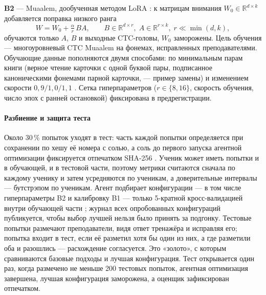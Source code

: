 \textbf{B2} --- Muaalem, дообученная методом LoRA \cite{SRC-111}: к матрицам внимания $W_0\in\mathbb{R}^{d\times k}$
добавляется поправка низкого ранга
\begin{equation}
  W = W_0 + \tfrac{\alpha}{r}\,BA, \qquad B\in\mathbb{R}^{d\times r},\; A\in\mathbb{R}^{r\times k},\; r\ll\min(d,k),
\end{equation}
обучаются только $A$, $B$ и выходные CTC-головы, $W_0$ заморожены. Цель обучения --- многоуровневый CTC
Muaalem на фонемах, исправленных преподавателями. Обучающие данные пополняются двумя способами: по
минимальным парам книги (верное чтение карточки с одной буквой пары, подписанное каноническими фонемами
парной карточки, --- пример замены) \cite{SRC-119} и изменением скорости $0{,}9/1{,}0/1{,}1$
\cite{SRC-120}. Сетка гиперпараметров ($r\in\{8,16\}$, скорость обучения, число эпох с ранней остановкой)
фиксирована в предрегистрации.

\paragraph{Разбиение и защита теста} Около 30\,\% попыток уходят в тест: часть каждой попытки
определяется при сохранении по хешу её номера с солью, а соль до первого запуска агентной оптимизации
фиксируется отпечатком SHA-256 \cite{SRC-122}. Ученик может иметь попытки и в обучающей, и в тестовой
части, поэтому метрики считаются сначала по каждому ученику и затем усредняются по ученикам, а
доверительные интервалы --- бутстрэпом по ученикам. Агент подбирает конфигурации --- в том числе
гиперпараметры B2 и калибровку B1 --- только 5-кратной кросс-валидацией внутри обучающей части \cite{SRC-121}; журнал всех опробованных
конфигураций публикуется, чтобы выбор лучшей нельзя было принять за подгонку. Тестовые попытки размечают преподаватели,
видя ответ тренажёра и исправляя его; попытка входит в тест, если её разметил хотя бы один из них, а где
разметили оба и разошлись --- расхождение согласуется. Это «золото», с которым сравниваются базовые подходы и
лучшая конфигурация. Тест открывается один раз, когда размечено не меньше 200 тестовых попыток, агентная оптимизация завершена, лучшая конфигурация заморожена,
а оценщик зафиксирован отпечатком.

